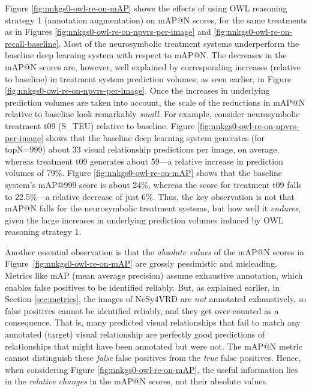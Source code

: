 \documentclass[]{jair}
\begin{document}
Figure \ref{fig:nnkgs0-owl-re-on-mAP} shows the effects of using OWL reasoning strategy 1 (annotation augmentation) on mAP@N scores, for the same treatments as in Figures \ref{fig:nnkgs0-owl-re-on-npvrs-per-image} and \ref{fig:nnkgs0-owl-re-on-recall-baseline}.
Most of the neurosymbolic treatment systems underperform the baseline deep learning system with respect to mAP@N.
The decreases in the mAP@N scores are, however, well explained by corresponding increases (relative to baseline) in treatment system prediction volumes, as seen earlier, in Figure \ref{fig:nnkgs0-owl-re-on-npvrs-per-image}.
Once the increases in underlying prediction volumes are taken into account, the scale of the reductions in mAP@N relative to baseline look remarkably \emph{small}.
For example, consider neurosymbolic treatment t09 (S\_TEU) relative to baseline.
Figure \ref{fig:nnkgs0-owl-re-on-npvrs-per-image} shows that the baseline deep learning system generates (for topN=999) about 33 visual relationship predictions per image, on average, whereas treatment t09 generates about 59---a relative increase in prediction volumes of 79\%.
Figure \ref{fig:nnkgs0-owl-re-on-mAP} shows that the baseline system's mAP@999 score is about 24\%, whereas the score for treatment t09 falls to 22.5\%---a relative decrease of just 6\%.
Thus, the key observation is not that mAP@N falls for the neurosymbolic treatment systems, but how well it \emph{endures}, given the large increases in underlying prediction volumes induced by OWL reasoning strategy 1.

Another essential observation is that the \emph{absolute values} of the mAP@N scores in Figure~\ref{fig:nnkgs0-owl-re-on-mAP} are grossly pessimistic and misleading.
Metrics like mAP (mean average precision) assume exhaustive annotation, which enables false positives to be identified reliably.
But, as explained earlier, in Section \ref{sec:metrics}, the images of NeSy4VRD are \emph{not} annotated exhaustively, so false positives cannot be identified reliably, and they get over-counted as a consequence.
That is, many predicted visual relationships that fail to match any annotated (target) visual relationship are perfectly good predictions of relationships that might have been annotated but were not.
The mAP@N metric cannot distinguish these \emph{false} false positives from the \emph{true} false positives.
Hence, when considering Figure \ref{fig:nnkgs0-owl-re-on-mAP}, the useful information lies in the \emph{relative changes} in the mAP@N scores, not their absolute values.
\end{document}
